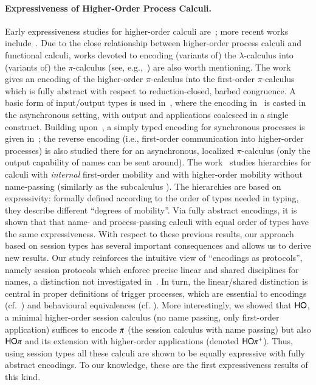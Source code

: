 \paragraph{Expressiveness of Higher-Order Process Calculi.}
Early expressiveness studies for higher-order calculi are~\cite{Tho90,San923}; 
more recent works include~\cite{BundgaardHG06,DBLP:conf/icalp/LanesePSS10,DBLP:journals/iandc/LanesePSS11,XuActa2012,DBLP:conf/wsfm/XuYL13}.
Due to the close relationship between higher-order process calculi and functional calculi, 
works devoted to encoding (variants of) the $\lambda$-calculus into (variants of) the $\pi$-calculus (see, e.g.,~\cite{San92,DBLP:journals/tcs/Fu99,DBLP:journals/iandc/YoshidaBH04,BHY,DBLP:conf/concur/SangiorgiX14}) are also worth mentioning.
The work~\cite{San923} gives an encoding of the higher-order $\pi$-calculus
into the first-order $\pi$-calculus which is fully abstract with respect to reduction-closed, barbed congruence. 
A basic form of input/output types is used in~\cite{DBLP:journals/tcs/Sangiorgi01}, where the encoding in~\cite{San923} is casted in the asynchronous setting, with output and applications coalesced in a single construct. Building upon~\cite{DBLP:journals/tcs/Sangiorgi01}, 
a simply typed encoding for synchronous processes is given in~\cite{SaWabook}; the reverse encoding (i.e.,  first-order communication into higher-order processes) is also studied there for an asynchronous, localized $\pi$-calculus (only the output capability of names can be sent around).
The work~\cite{San96int} studies hierarchies for calculi with \emph{internal} first-order mobility and 
with higher-order mobility without name-passing (similarly as the subcalculus \HO). 
The hierarchies are based on expressivity: 
formally defined according to the order of types needed in typing, 
they describe different ``degrees of mobility''.
Via fully abstract encodings, it is shown that that name- and process-passing calculi with equal order of types have the same expressiveness.
With respect to these previous results, our approach based on session types 
has several important consequences and allows us to derive new results.  Our study reinforces the intuitive view of ``encodings as protocols'', namely session protocols which enforce precise linear and shared disciplines for names, a distinction not investigated in~\cite{San923,DBLP:journals/tcs/Sangiorgi01}. 
In turn, the linear/shared distinction is central in proper definitions of trigger processes, which are essential to encodings (cf.~) and behavioural equivalences (cf. ).
More interestingly, we showed that $\mathsf{HO}$, a  minimal higher-order session calculus (no name passing, only first-order application) suffices to encode $\pi$ (the session calculus with name passing) but also 
$\mathsf{HO}\pi$  and 
its extension  with higher-order applications (denoted $\mathsf{HO}\pi^{\mathsf +}$). 
Thus, using session types all these calculi are shown to be equally expressive with fully abstract encodings.
To our knowledge, these are the first expressiveness results of this kind.

